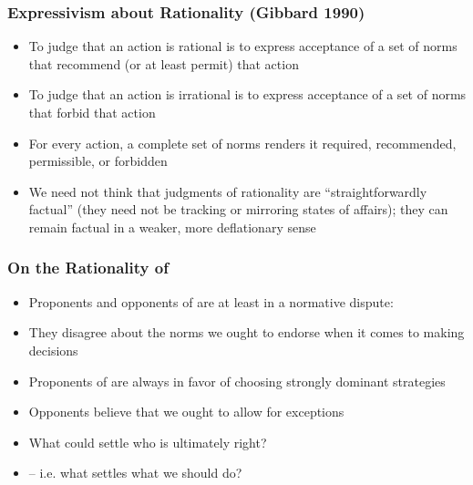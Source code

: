 \begin{frame}
\frametitle{Expressivism about Rationality (Gibbard 1990)}

\begin{itemize}[<+->]

\item To judge that an action is rational is to express acceptance of a set of norms that recommend (or at least permit) that action

\item To judge that an action is irrational is to express acceptance of a set of norms that forbid that action

\item For every action, a complete set of norms renders it required, recommended, permissible, or forbidden 

\item We need not think that judgments of rationality are ``straightforwardly factual'' (they need not be tracking or mirroring states of affairs); they can remain factual in a weaker, more deflationary sense 


\end{itemize}
\end{frame}

\begin{frame}
\frametitle{On the Rationality of }

\begin{itemize}[<+->]

\item Proponents and opponents of  are at least in a normative dispute:

\item[] They disagree about the norms we ought to endorse when it comes to making decisions

\item Proponents of  are always in favor of choosing strongly dominant strategies

\item Opponents believe that we ought to allow for exceptions 

\item What could settle who is ultimately right? 

\item[] -- i.e. what settles what we should do?


\end{itemize}
\end{frame}

